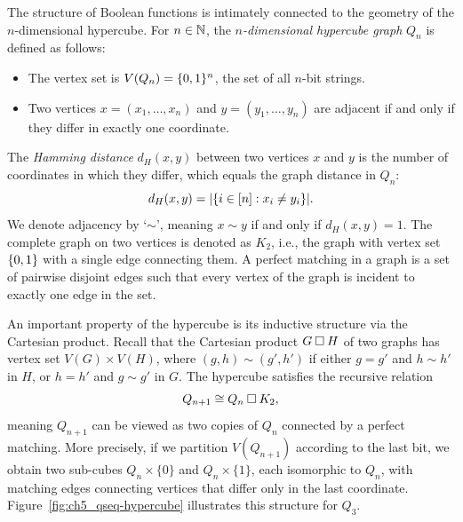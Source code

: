 The structure of Boolean functions is intimately connected to the geometry of the $n$-dimensional hypercube.
For $n \in \mathbb{N}$, the \emph{$n$-dimensional hypercube graph} $Q_n$ is defined as follows:
\begin{itemize}
    \item The vertex set is $V(Q_n) = \{ 0, 1 \}^n$, the set of all $n$-bit strings.
    \item Two vertices $x = (x_1,\ldots,x_n)$ and $y = (y_1,\ldots,y_n)$ are adjacent if and only if they differ in exactly one coordinate.
\end{itemize}

The \emph{Hamming distance} $d_H(x,y)$ between two vertices $x$ and $y$ is the number of coordinates in which they differ, which equals the graph distance in $Q_n$:
\begin{equation}
    d_H(x,y) = \abs{\{i \in [n] : x_i \neq y_i\}}.
\end{equation}
We denote adjacency by `$\sim$', meaning $x \sim y$ if and only if $d_H(x, y) = 1$.
The complete graph on two vertices is denoted as $K_2$, i.e., the graph with vertex set $\{ 0, 1 \}$ with a single edge connecting them.
A perfect matching in a graph is a set of pairwise disjoint edges such that every vertex of the graph is incident to exactly one edge in the set.

An important property of the hypercube is its inductive structure via the Cartesian product.
Recall that the Cartesian product $G \mathbin{\square} H$ of two graphs has vertex set $V(G) \times V(H)$, where $(g,h) \sim (g',h')$ if either $g = g'$ and $h \sim h'$ in $H$, or $h = h'$ and $g \sim g'$ in $G$.
The hypercube satisfies the recursive relation
\begin{equation}\label{eq:ch5_qseq-cart-prod}
    Q_{n+1} \cong Q_n \mathbin{\square} K_2,
\end{equation}
meaning $Q_{n+1}$ can be viewed as two copies of $Q_n$ connected by a perfect matching.
More precisely, if we partition $V(Q_{n+1})$ according to the last bit, we obtain two sub-cubes $Q_n \times \{0\}$ and $Q_n \times \{1\}$, each isomorphic to $Q_n$, with matching edges connecting vertices that differ only in the last coordinate.
Figure~\ref{fig:ch5_qseq-hypercube} illustrates this structure for $Q_3$.

